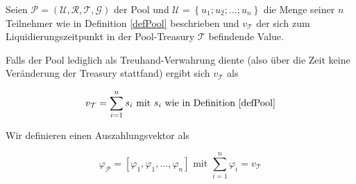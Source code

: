 \begin{Fazit}

Seien $\mathcal{P} = \left( \mathcal{U}, \mathcal{R}, \mathcal{T}, \mathcal{G} \right)$ 
der Pool und $\mathcal{U} = \left\{ u_1; u_2;...;u_n \right\}$ die Menge seiner $n$ Teilnehmer wie in Definition \ref{defPool} beschrieben und $v_{\mathcal{T}}$ der sich zum Liquidierungszeitpunkt in der Pool-Treasury $\mathcal{T}$ befindende Value. 

Falls der Pool lediglich als Treuhand-Verwahrung diente (also über die Zeit keine Veränderung der Treasury stattfand) ergibt sich $v_{\mathcal{T}}$ als  

\vspace{0.1cm}

\begin{equation*}
  v_{\mathcal{T}} = \sum_{i=1}^{n} s_i \text{ mit } s_i \text{ wie in Definition \ref{defPool}}
\end{equation*}

\vspace{0.2cm}

Wir definieren einen Auszahlungsvektor als

\begin{equation*}
  \varphi_{\mathcal{P}} = [\varphi_1, \varphi_1, ..., \varphi_n] \text{ mit } \sum_{i=1}^{n} \varphi_i = v_{\mathcal{T}} 
\end{equation*}

\vspace{0.2cm}


\vspace{0.2cm}


\vspace{0.2cm}


\end{Fazit}

\vspace{0.3cm}


\vspace{0.5cm}